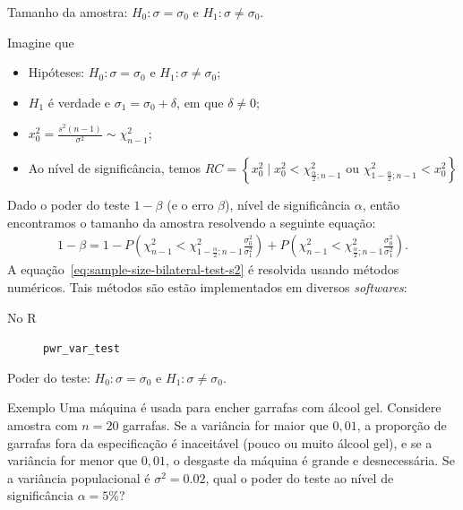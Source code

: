 \documentclass[8pt]{beamer}
\begin{document}
\begin{frame}{Tamanho da amostra: $H_0: \sigma = \sigma_0$ e $H_1: \sigma \neq \sigma_0$.}

Imagine que
\begin{itemize}
	\item Hipóteses: $H_0: \sigma=\sigma_0$ e $H_1: \sigma \neq \sigma_0$;
	\item $H_1$ é verdade e $\sigma_1 = \sigma_0 + \delta$, em que $\delta \neq 0$;
	\item $x_0^2 = \frac{s^2(n-1)}{\sigma^2} \sim \chi_{n-1}^2$;
	\item Ao nível de significância, temos $RC=\left\{ x_0^2 \mid x_0^2 < \chi_{\frac{\alpha}{2};n-1}^2 \mbox{ ou } \chi_{1-\frac{\alpha}{2};n-1}^2 < x_0^2  \right\}$
\end{itemize}
\vfill

Dado o poder do teste $1-\beta$ (e o erro $\beta$), nível de significância $\alpha$, então encontramos o tamanho da amostra resolvendo a seguinte equação:
\begin{align}\label{eq:sample-size-bilateral-test-s2}
	1-\beta = 1- P \left( \chi_{n-1}^2 < \chi_{1-\frac{\alpha}{2};n-1}^2 \frac{\sigma_0^2}{\sigma_1^2} \right) + P \left( \chi_{n-1}^2 < \chi_{\frac{\alpha}{2};n-1}^2 \frac{\sigma_0^2}{\sigma_1^2} \right).
\end{align}
A equação~\eqref{eq:sample-size-bilateral-test-s2} é resolvida usando métodos numéricos. Tais métodos são estão implementados em diversos \textit{softwares}:
\begin{description}
	\item[No R] \texttt{pwr\_var\_test}
\end{description}
\end{frame}

\begin{frame}{Poder do teste: $H_0: \sigma = \sigma_0$ e $H_1: \sigma \neq \sigma_0$.}

\large

\begin{block}{Exemplo}
	Uma máquina é usada para encher garrafas com álcool gel. Considere amostra com $n=20$ garrafas. Se a variância for maior que $0,01$, a proporção de garrafas fora da especificação é inaceitável (pouco ou muito álcool gel), e se a variância for menor que $0,01$, o desgaste da máquina é grande e desnecessária. Se a variância populacional é $\sigma^2=0.02$, qual o poder do teste ao nível de significância $\alpha=5\%$?
\end{block}

\normalsize
\end{frame}
\end{document}
